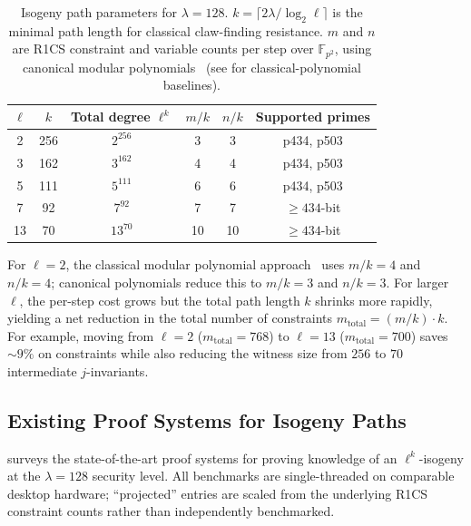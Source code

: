 \documentclass[11pt,a4paper]{article}
\theoremstyle{definition}
\theoremstyle{remark}
\newcommand{\F}{\mathbb{F}}
\begin{document}
\begin{table}[H]
	\centering
	\caption{Isogeny path parameters for $\lambda = 128$. $k = \lceil 2\lambda
		/ \log_2 \ell \rceil$ is the minimal path length for classical claw-finding
		resistance. $m$ and $n$ are R1CS constraint and variable counts per step
		over $\F_{p^2}$, using canonical modular polynomials~\cite{canonicalModPoly}
		(see  for classical-polynomial baselines).}
	\label{tab:isogeny-params-128}
	\begin{tabular}{c c c c c c}
		\toprule
		$\ell$ & $k$ & Total degree $\ell^k$ & $m/k$ & $n/k$ & Supported primes \\
		\midrule
		2  & 256 & $2^{256}$   & 3   & 3   & p434, p503 \\
		3  & 162 & $3^{162}$   & 4   & 4   & p434, p503 \\
		5  & 111 & $5^{111}$   & 6   & 6   & p434, p503 \\
		7  & 92  & $7^{92}$    & 7   & 7   & $\ge 434$-bit \\
		13 & 70  & $13^{70}$   & 10  & 10  & $\ge 434$-bit \\
		\bottomrule
	\end{tabular}
\end{table}

For $\ell = 2$, the classical modular polynomial
approach~\cite{CLL23} uses $m/k = 4$ and $n/k = 4$; canonical polynomials
reduce this to $m/k = 3$ and $n/k = 3$.
For larger $\ell$, the per-step cost grows but the total path length $k$
shrinks more rapidly, yielding a net reduction in the total number of
constraints $m_{\text{total}} = (m/k) \cdot k$.
For example, moving from $\ell = 2$ ($m_{\text{total}} = 768$) to
$\ell = 13$ ($m_{\text{total}} = 700$) saves $\sim 9\%$ on constraints
while also reducing the witness size from $256$ to $70$ intermediate
$j$-invariants.

\subsection{Existing Proof Systems for Isogeny Paths}

 surveys the state-of-the-art proof systems
for proving knowledge of an $\ell^k$-isogeny at the $\lambda = 128$ security
level. All benchmarks are single-threaded on comparable desktop hardware;
``projected'' entries are scaled from the underlying R1CS constraint counts
rather than independently benchmarked.
\end{document}
